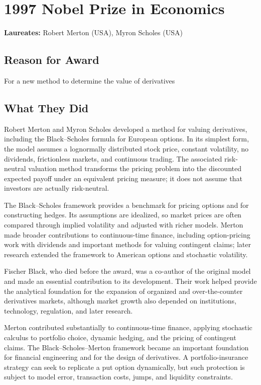 \chapter{1997 Nobel Prize in Economics}
\textbf{Laureates: }Robert Merton (USA), Myron Scholes (USA)

\section*{Reason for Award}
For a new method to determine the value of derivatives

\section{What They Did}
Robert Merton and Myron Scholes developed a method for valuing derivatives,
including the Black--Scholes formula for European options. In its simplest form,
the model assumes a lognormally distributed stock price, constant volatility,
no dividends, frictionless markets, and continuous trading. The associated
risk-neutral valuation method transforms the pricing problem into the discounted
expected payoff under an equivalent pricing measure; it does not assume that
investors are actually risk-neutral.

The Black--Scholes framework provides a benchmark for pricing options and for
constructing hedges. Its assumptions are idealized, so market prices are often
compared through implied volatility and adjusted with richer models. Merton made
broader contributions to continuous-time finance, including option-pricing work
with dividends and important methods for valuing contingent claims; later
research extended the framework to American options and stochastic volatility.

Fischer Black, who died before the award, was a co-author of the original model
and made an essential contribution to its development. Their work helped provide
the analytical foundation for the expansion of organized and over-the-counter
derivatives markets, although market growth also depended on institutions,
technology, regulation, and later research.

Merton contributed substantially to continuous-time finance, applying stochastic
calculus to portfolio choice, dynamic hedging, and the pricing of contingent
claims. The Black--Scholes--Merton framework became an important foundation for
financial engineering and for the design of derivatives. A portfolio-insurance
strategy can seek to replicate a put option dynamically, but such protection is
subject to model error, transaction costs, jumps, and liquidity constraints.

